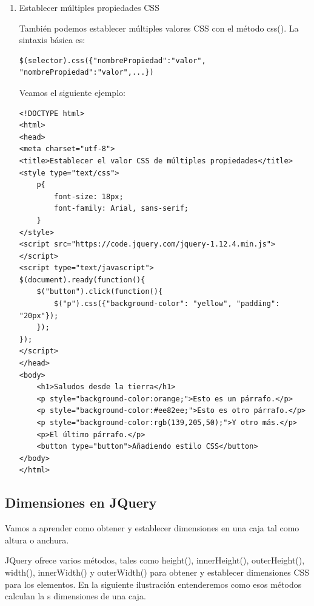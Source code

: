 \documentclass[a4paper, oneside]{article}
\begin{document}
\begin{enumerate}
\item Establecer múltiples propiedades CSS
\label{sec:orgb200db7}

También podemos establecer múltiples valores CSS con el método css(). La sintaxis básica es:

\begin{verbatim}
$(selector).css({"nombrePropiedad":"valor", "nombrePropiedad":"valor",...})
\end{verbatim}

Veamos el siguiente ejemplo:

\begin{verbatim}
<!DOCTYPE html>
<html>
<head>
<meta charset="utf-8">
<title>Establecer el valor CSS de múltiples propiedades</title>
<style type="text/css">
    p{
        font-size: 18px;
        font-family: Arial, sans-serif;
    }
</style>
<script src="https://code.jquery.com/jquery-1.12.4.min.js"></script>
<script type="text/javascript">
$(document).ready(function(){
    $("button").click(function(){
        $("p").css({"background-color": "yellow", "padding": "20px"});
    });    
});
</script>
</head>
<body>
    <h1>Saludos desde la tierra</h1>
    <p style="background-color:orange;">Esto es un párrafo.</p>
    <p style="background-color:#ee82ee;">Esto es otro párrafo.</p>
    <p style="background-color:rgb(139,205,50);">Y otro más.</p>
    <p>El último párrafo.</p>
    <button type="button">Añadiendo estilo CSS</button>
</body>
</html>                                		
\end{verbatim}
\end{enumerate}





\subsection{Dimensiones en JQuery}
\label{sec:orgecedafd}

Vamos a aprender como obtener y establecer dimensiones en una caja tal como altura o anchura.

JQuery ofrece varios métodos, tales como height(), innerHeight(), outerHeight(), width(), innerWidth() y outerWidth() para obtener y establecer dimensiones CSS para los elementos. En la siguiente ilustración entenderemos como esos métodos calculan la s dimensiones de una caja.
\end{document}
